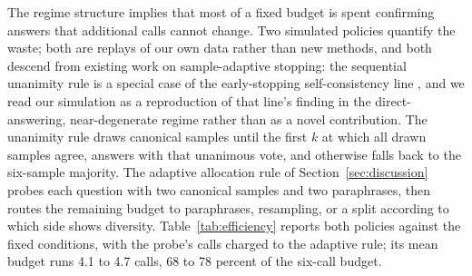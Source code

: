 The regime structure implies that most of a fixed budget is spent confirming answers that additional calls cannot change. Two simulated policies quantify the waste; both are replays of our own data rather than new methods, and both descend from existing work on sample-adaptive stopping: the sequential unanimity rule is a special case of the early-stopping self-consistency line \citep{aggarwal2023lets,li2024escape}, and we read our simulation as a reproduction of that line's finding in the direct-answering, near-degenerate regime rather than as a novel contribution. The unanimity rule draws canonical samples until the first $k$ at which all drawn samples agree, answers with that unanimous vote, and otherwise falls back to the six-sample majority. The adaptive allocation rule of Section~\ref{sec:discussion} probes each question with two canonical samples and two paraphrases, then routes the remaining budget to paraphrases, resampling, or a split according to which side shows diversity. Table~\ref{tab:efficiency} reports both policies against the fixed conditions, with the probe's calls charged to the adaptive rule; its mean budget runs 4.1 to 4.7 calls, 68 to 78 percent of the six-call budget.

\begin{table}[htbp]
\centering
\footnotesize
\caption{Budget efficiency. Accuracy (\%) of the fixed conditions against the sequential unanimity rule (ES, with mean budget $\bar{k}$) and the adaptive allocation rule (Ada, with mean budget and its share of the six-call budget), both simulated on the collected call matrices.}
\label{tab:efficiency}

\end{table}

